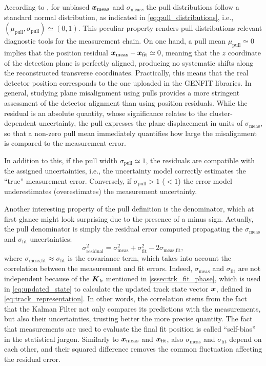According to \cite{pullArticle}, for unbiased $\boldsymbol{x}_\text{meas}$ and $\sigma_\text{meas}$, the pull distributions follow a standard normal distribution, as indicated in \autoref{eq:pull_distributions}, i.e., $(\mu_\text{pull},\sigma_\text{pull})\simeq(0,1)$. This peculiar property renders pull distributions relevant diagnostic tools for the measurement chain. On one hand, a pull mean $\mu_\text{pull}\simeq0$ implies that the position residual $\boldsymbol{x}_{\text{meas}}-\boldsymbol{x}_{\text{fit}}\simeq0$, meaning that the $z$ coordinate of the detection plane is perfectly aligned, producing no systematic shifts along the reconstructed transverse coordinates. Practically, this means that the real detector position corresponds to the one uploaded in the GENFIT libraries. In general, studying plane misalignment using pulls provides a more stringent assessment of the detector alignment than using position residuals. While the residual is an absolute quantity, whose significance relates to the cluster-dependent uncertainty, the pull expresses the plane displacement in units of $\sigma_\text{meas}$, so that a non-zero pull mean immediately quantifies how large the misalignment is compared to the measurement error.

In addition to this, if the pull width $\sigma_\text{pull}\simeq1$, the residuals are compatible with the assigned uncertainties, i.e., the uncertainty model correctly estimates the ``true'' measurement error. Conversely, if $\sigma_\text{pull}>1$ ($<1$) the error model underestimates (overestimates) the measurement uncertainty.

Another interesting property of the pull definition is the denominator, which at first glance might look surprising due to the presence of a minus sign. Actually, the pull denominator is simply the residual error computed propagating the $\sigma_\text{meas}$ and $\sigma_\text{fit}$ uncertainties:
\begin{equation}
	\sigma^2_\text{residual}=\sigma^2_\text{meas}+\sigma^2_\text{fit}-2\sigma_\text{meas,fit},
	\label{eq:residual_err}
\end{equation}
where $\sigma_\text{meas,fit}\approx\sigma_\text{fit}$ is the covariance term, which takes into account the correlation between the measurement and fit errors. Indeed, $\sigma_\text{meas}$ and $\sigma_\text{fit}$ are not independent because of the $\boldsymbol{K}_k$ mentioned in \autoref{sssec:trk_fit_phase}, which is used in \autoref{eq:updated_state} to calculate the updated track state vector $\boldsymbol{x}$, defined in \autoref{eq:track_representation}. In other words, the correlation stems from the fact that the Kalman Filter not only compares its predictions with the measurements, but also their uncertainties, trusting better the more precise quantity. The fact that measurements are used to evaluate the final fit position is called ``self-bias'' in the statistical jargon. Similarly to $\boldsymbol{x}_{\text{meas}}$ and $\boldsymbol{x}_{\text{fit}}$, also $\sigma_\text{meas}$ and $\sigma_\text{fit}$ depend on each other, and their squared difference removes the common fluctuation affecting the residual error.

